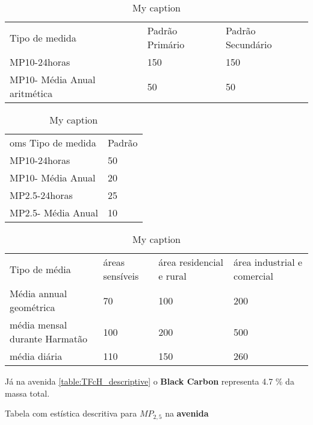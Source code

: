 \begin{table}[]
\centering
\caption{My caption}
\label{my-label}
\begin{tabular}{lll}
Tipo de medida               & Padrão Primário & Padrão Secundário \\
MP10-24horas                 & 150             & 150               \\
MP10- Média Anual aritmética & 50              & 50               
\end{tabular}
\end{table}

\begin{table}[]
\centering
\caption{My caption}
\label{my-label}
\begin{tabular}{ll}
oms Tipo de medida & Padrão \\
MP10-24horas       & 50     \\
MP10- Média Anual  & 20     \\
MP2.5-24horas      & 25     \\
MP2.5- Média Anual & 10    
\end{tabular}
\end{table}

\begin{table}[]
\centering
\caption{My caption}
\label{my-label}
\begin{tabular}{llll}
Tipo de média                 & áreas sensíveis & área residencial e rural & área industrial e comercial \\
Média annual geométrica       & 70              & 100                      & 200                         \\
média mensal durante Harmatão & 100             & 200                      & 500                         \\
média diária                  & 110             & 150                      & 260                        
\end{tabular}
\end{table}


Já na avenida \ref{table:TFcH_descriptive} o \textbf{Black Carbon} 
representa 4.7 \% da massa total.

\begin{table}[H]
  \centering
  \begin{scriptsize}
    
  \end{scriptsize}
  \caption{Tabela com estística descritiva para $MP_{2,5}$ na \textbf{avenida}
          \label{table:TFcH_descriptive}}
\end{table}

